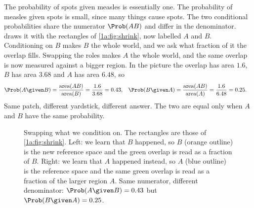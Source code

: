 The probability of spots given measles is essentially one. The probability of
measles given spots is small, since many things cause spots. The two
conditional probabilities share the numerator $\Prob(AB)$ and differ in the
denominator.  draws it with the rectangles of
\cref{1a:fig:shrink}, now labelled $A$ and $B$. Conditioning on $B$ makes $B$
the whole world, and we ask what fraction of it the overlap fills. Swapping the
roles makes $A$ the whole world, and the same overlap is now measured against a
bigger region. In the picture the overlap has area $1.6$, $B$ has area $3.68$
and $A$ has area $6.48$, so
\begin{align*}
  \Prob(A\given B)&=\frac{\text{area}(AB)}{\text{area}(B)}=\frac{1.6}{3.68}=0.43,
  &
  \Prob(B\given A)&=\frac{\text{area}(AB)}{\text{area}(A)}=\frac{1.6}{6.48}=0.25 .
\end{align*}
Same patch, different yardstick, different answer. The two are equal only when
$A$ and $B$ have the same probability.

\begin{figure}[htbp]
\centering
{}
\caption{Swapping what we condition on. The rectangles are those of
\cref{1a:fig:shrink}. Left: we learn that $B$ happened, so $B$ (orange outline)
is the new reference space and the green overlap is read as a fraction of
$B$. Right: we learn that $A$ happened instead, so $A$ (blue outline) is the
reference space and the same green overlap is read as a fraction of the larger
region $A$. Same numerator, different denominator: $\Prob(A\given B)=0.43$ but
$\Prob(B\given A)=0.25$.}
\label{1a:fig:swap}
\end{figure}

